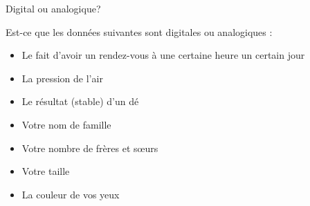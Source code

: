 \begin{exercice}
  \begin{exercicelet}{Digital ou analogique?}
    \begin{questions}
    \item Est-ce que les données suivantes sont digitales ou analogiques :
      \begin{itemize}
      \item Le fait d'avoir un rendez-vous à une certaine heure un certain jour
      \item La pression de l'air
      \item Le résultat (stable) d'un dé
      \item Votre nom de famille
      \item Votre nombre de frères et sœurs
      \item Votre taille
      \item La couleur de vos yeux
      \end{itemize}
    \end{questions}
  \end{exercicelet}
\end{exercice}
